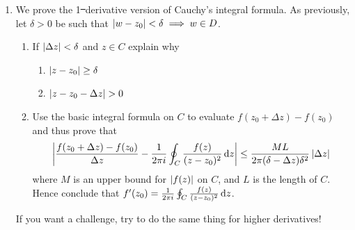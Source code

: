 \begin{exercises*}
\begin{enumerate}
  
	\item\label{exs:cauchyintgeneral} We prove the 1\st\ derivative version of Cauchy's integral formula. As previously, let $\delta>0$ be such that $\left| w-z_0\right|<\delta\implies w\in D$.
	\begin{enumerate}
	  \item If $\left| \Delta z\right|<\delta$ and $z\in C$ explain why
	  \begin{enumerate}
	    \item $\left| z-z_0\right|\ge \delta$
	    \item $\nm{z-z_0-\Delta z}>0$ 
	  \end{enumerate}
	  \item Use the basic integral formula on $C$ to evaluate $f(z_0+\Delta z)-f(z_0)$ and thus prove that
	  \[\left| \frac{f(z_0+\Delta z)-f(z_0)}{\Delta z}-\frac 1{2\pi i}\oint_C\frac{f(z)}{(z-z_0)^2}\,{\mathrm{d} z}\right| \le \frac{ML}{2\pi(\delta-\Delta z)\delta^2}\left| \Delta z\right|\]
	  where $M$ is an upper bound for $\left| f(z)\right|$ on $C$, and $L$ is the length of $C$. Hence conclude that $f'(z_0)=\frac 1{2\pi i}\oint_C\frac{f(z)}{(z-z_0)^2}\,{\mathrm{d} z}$.
	\end{enumerate}
	If you want a challenge, try to do the same thing for higher derivatives!
	
	
	  
\end{enumerate}
\end{exercises*}
  

